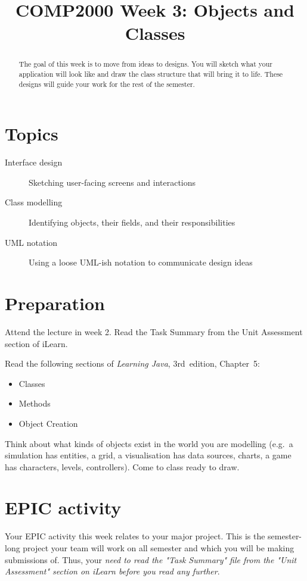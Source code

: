 \documentclass[twoside=false,DIV=14]{scrartcl}
\title{\color{redish} \vspace{-1em}COMP2000 Week 3: Objects and Classes}
\begin{document}
{\color{blackish}\maketitle}\vspace{-7em}

\begin{abstract}
The goal of this week is to move from ideas to designs.  You will sketch what your application will look like and draw the class structure that will bring it to life.  These designs will guide your work for the rest of the semester.
\end{abstract}

\section*{Topics}
\begin{description}
\item[Interface design] Sketching user-facing screens and interactions
\item[Class modelling] Identifying objects, their fields, and their responsibilities
\item[UML notation] Using a loose UML-ish notation to communicate design ideas
\end{description}

\section*{Preparation}
Attend the lecture in week 2.  Read the Task Summary from the Unit Assessment section of iLearn.

Read the following sections of \textit{Learning Java}, 3rd~edition, Chapter~5:
\begin{itemize}
    \item Classes
    \item Methods
    \item Object Creation
\end{itemize}

Think about what kinds of objects exist in the world you are modelling (e.g.\ a simulation has entities, a grid, a visualisation has data sources, charts, a game has characters, levels, controllers).
Come to class ready to draw.


\section*{EPIC activity}

Your EPIC activity this week relates to your major project.  This is the semester-long project your team will work on all semester and which you will be making submissions of.  Thus, your \emph{need to read the "Task Summary" file from the "Unit Assessment" section on iLearn before you read any further}.
\end{document}
